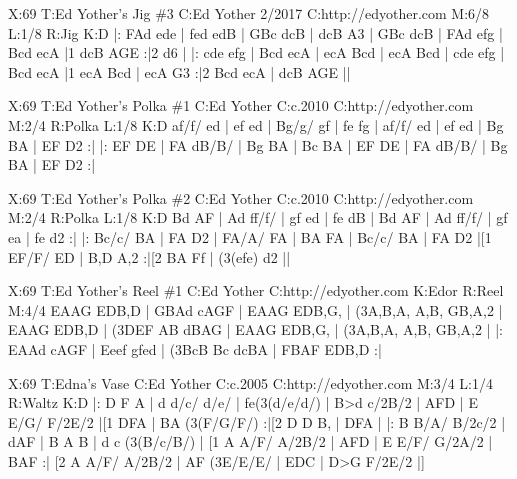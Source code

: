\documentclass[letterpaper]{article}
\begin{document}
\begin{abc}[name]
X:69
T:Ed Yother's Jig \#3
C:Ed Yother 2/2017
C:http://edyother.com
M:6/8
L:1/8
R:Jig
K:D
|: FAd ede | fed edB | GBc dcB | dcB A3 |
GBc dcB | FAd efg | Bcd ecA |1 dcB AGE :|2 d6 | 
|: cde efg | Bcd ecA | ecA Bcd | ecA Bcd | 
cde efg | Bcd ecA |1 ecA Bcd | ecA G3 :|2  Bcd ecA | dcB AGE ||
\end{abc}

\begin{abc}[name]
X:69
T:Ed Yother's Polka \#1
C:Ed Yother
C:c.2010
C:http://edyother.com
M:2/4
R:Polka
L:1/8
K:D
af/f/ ed | ef ed | Bg/g/ gf | fe fg |
af/f/ ed | ef ed | Bg BA | EF D2 :|
|: EF DE | FA dB/B/ | Bg BA | Bc BA |
EF DE | FA dB/B/ | Bg BA | EF D2 :|
\end{abc}

\begin{abc}[name]
X:69
T:Ed Yother's Polka \#2
C:Ed Yother
C:c.2010
C:http://edyother.com
M:2/4
R:Polka
L:1/8
K:D
Bd AF | Ad ff/f/ | gf ed | fe dB |
Bd AF | Ad ff/f/ | gf ea | fe d2 :|
|: Bc/c/ BA | FA D2 | FA/A/ FA | BA FA |
Bc/c/ BA | FA D2 |[1 EF/F/ ED | B,D A,2 :|[2 BA Ff | (3(efe) d2 || 
\end{abc}

\begin{abc}[name]
X:69
T:Ed Yother's Reel \#1
C:Ed Yother
C:http://edyother.com
K:Edor
R:Reel
M:4/4
EAAG EDB,D | GBAd cAGF | EAAG EDB,G, | (3A,B,A, A,B, GB,A,2 |
EAAG EDB,D | (3DEF AB dBAG | EAAG EDB,G, | (3A,B,A, A,B, GB,A,2 |
|:  EAAd cAGF | Eeef gfed | (3BcB Bc dcBA | FBAF EDB,D :|
\end{abc}

\begin{abc}[name]
X:69
T:Edna's Vase
C:Ed Yother
C:c.2005
C:http://edyother.com
M:3/4
L:1/4
R:Waltz
K:D
|:  D F A | d d/c/ d/e/ | fe(3(d/e/d/) |  B>d c/2B/2 |
 AFD | E E/G/ F/2E/2 |[1  DFA | BA (3(F/G/F/) :|[2  D D B, |  DFA |
|:  B B/A/ B/2c/2 | dAF | B A B | d c (3(B/c/B/) |
[1 A A/F/ A/2B/2 | AFD | E E/F/ G/2A/2 | BAF :|
[2 A A/F/ A/2B/2 | AF (3E/E/E/ |  EDC |  D>G F/2E/2 |]
\end{abc}
\end{document}
